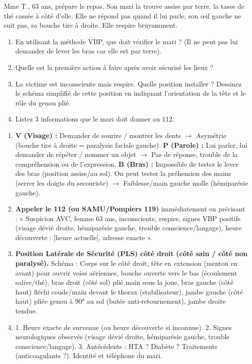 \documentclass[11pt]{article}
\begin{document}
\begin{exercice}
Mme T., 63 ans, prépare le repas. Son mari la trouve assise par terre, la tasse de thé cassée à côté d'elle. Elle ne répond pas quand il lui parle, son œil gauche ne suit pas, sa bouche tire à droite. Elle respire bruyamment.
\begin{enumerate}
    \item En utilisant la méthode VBP, que doit vérifier le mari ? (Il ne peut pas lui demander de lever les bras car elle est par terre).
    \item Quelle est la première action à faire après avoir sécurisé les lieux ?
    \item La victime est inconsciente mais respire. Quelle position installer ? Dessinez le schéma simplifié de cette position en indiquant l'orientation de la tête et le rôle du genou plié.
    \item Listez 3 informations que le mari doit donner au 112.
\end{enumerate}
\end{exercice}

\begin{corrige}
\begin{enumerate}
    \item \textbf{V (Visage) :} Demander de sourire / montrer les dents $\rightarrow$ Asymétrie (bouche tire à droite = paralysie faciale gauche). \textbf{P (Parole) :} Lui parler, lui demander de répéter / nommer un objet $\rightarrow$ Pas de réponse, trouble de la compréhension ou de l'expression. \textbf{B (Bras) :} Impossible de tester le lever des bras (position assise/au sol). On peut tester la préhension des mains (serrer les doigts du secouriste) $\rightarrow$ Faiblesse/main gauche molle (hémiparésie gauche).
    \item \textbf{Appeler le 112 (ou SAMU/Pompiers 119)} immédiatement en précisant : « Suspicion AVC, femme 63 ans, inconsciente, respire, signes VBP positifs (visage dévié droite, hémiparésie gauche, trouble conscience/langage), heure découverte : [heure actuelle], adresse exacte ».
    \item \textbf{Position Latérale de Sécurité (PLS) côté droit (côté sain / côté non paralysé).} Schéma : Corps sur le côté droit, tête en extension (menton en avant) pour ouvrir voies aériennes, bouche ouverte vers le bas (écoulement salive/thé), bras droit (côté sol) plié main sous la joue, bras gauche (côté haut) fléchi coude/main devant le thorax (stabilisateur), jambe gauche (côté haut) pliée genou à 90° au sol (butée anti-retournement), jambe droite tendue.
    \item 1. Heure exacte de survenue (ou heure découverte si inconnue). 2. Signes neurologiques observés (visage dévié droite, hémiparésie gauche, trouble conscience/langage). 3. Antécédents : HTA ? Diabète ? Traitements (anticoagulants ?). Identité et téléphone du mari.
\end{enumerate}
\end{corrige}
\end{document}

